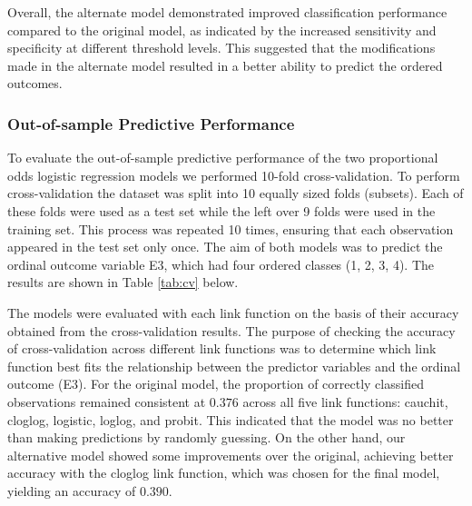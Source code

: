 \documentclass[titlepage]{article}
\begin{document}
\justify
Overall, the alternate model demonstrated improved classification performance compared to the original model, as indicated by the increased sensitivity and specificity at different threshold levels. This suggested that the modifications made in the alternate model resulted in a better ability to predict the ordered outcomes.

\subsubsection{Out-of-sample Predictive Performance}

To evaluate the out-of-sample predictive performance of the two proportional odds logistic regression models we performed 10-fold cross-validation. To perform cross-validation the dataset was split into 10 equally sized folds (subsets). Each of these folds were used as a test set while the left over 9 folds were used in the training set. This process was repeated 10 times, ensuring that each observation appeared in the test set only once. The aim of both models was to predict the ordinal outcome variable E3, which had four ordered classes (1, 2, 3, 4). The results are shown in Table \ref{tab:cv} below.

\justify
The models were evaluated with each link function on the basis of their accuracy obtained from the cross-validation results. The purpose of checking the accuracy of cross-validation across different link functions was to determine which link function best fits the relationship between the predictor variables and the ordinal outcome (E3). For the original model, the proportion of correctly classified observations remained consistent at $0.376$ across all five link functions: cauchit, cloglog, logistic, loglog, and probit. This indicated that the model was no better than making predictions by randomly guessing. On the other hand, our alternative model showed some improvements over the original, achieving better accuracy with the cloglog link function, which was chosen for the final model, yielding an accuracy of $0.390$.
\end{document}
